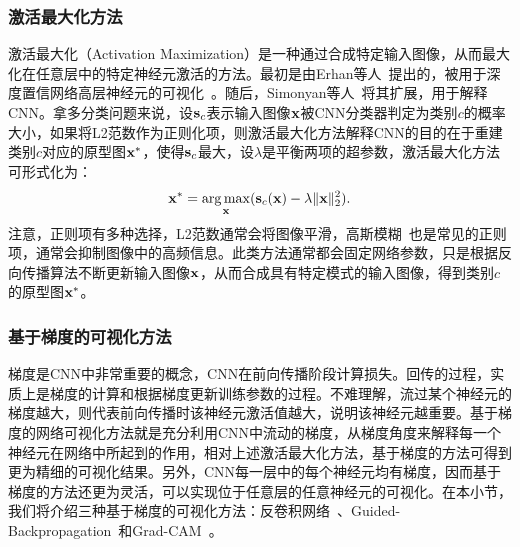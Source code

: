\subsubsection*{激活最大化方法}
激活最大化（Activation Maximization）是一种通过合成特定输入图像，从而最大化在任意层中的特定神经元激活的方法。最初是由Erhan等人~\cite{erhan2009visualizing}提出的，被用于深度置信网络高层神经元的可视化~\cite{hinton2006fast}。随后，Simonyan等人~\cite{simonyan2013deep}将其扩展，用于解释CNN。拿多分类问题来说，设$\mathbf{s}_{c}$表示输入图像$\mathbf{x}$被CNN分类器判定为类别$c$的概率大小，如果将L2范数作为正则化项，则激活最大化方法解释CNN的目的在于重建类别$c$对应的原型图$\mathbf{x^*}$，使得$\mathbf{s}_c$最大，设$\lambda$是平衡两项的超参数，激活最大化方法可形式化为：
\begin{equation}
\mathbf{x}^*=\underset{\mathbf{x}}{\operatorname{arg\,max}}( {\mathbf{s}}_{c}(\mathbf{x})-\lambda\|\mathbf{x}\|_{2}^{2}).
\end{equation}
注意，正则项有多种选择，L2范数通常会将图像平滑，高斯模糊~\cite{haddad1991class}也是常见的正则项，通常会抑制图像中的高频信息。此类方法通常都会固定网络参数，只是根据反向传播算法不断更新输入图像$\mathbf{x}$，从而合成具有特定模式的输入图像，得到类别$c$的原型图$\mathbf{x}^*$。
\subsubsection*{基于梯度的可视化方法}
梯度是CNN中非常重要的概念，CNN在前向传播阶段计算损失。回传的过程，实质上是梯度的计算和根据梯度更新训练参数的过程。不难理解，流过某个神经元的梯度越大，则代表前向传播时该神经元激活值越大，说明该神经元越重要。基于梯度的网络可视化方法就是充分利用CNN中流动的梯度，从梯度角度来解释每一个神经元在网络中所起到的作用，相对上述激活最大化方法，基于梯度的方法可得到更为精细的可视化结果。另外，CNN每一层中的每个神经元均有梯度，因而基于梯度的方法还更为灵活，可以实现位于任意层的任意神经元的可视化。在本小节，我们将介绍三种基于梯度的可视化方法：反卷积网络~\cite{zeiler2010deconvolutional}、Guided-Backpropagation~\cite{springenberg2014striving}和Grad-CAM~\cite{selvaraju2017grad}。

